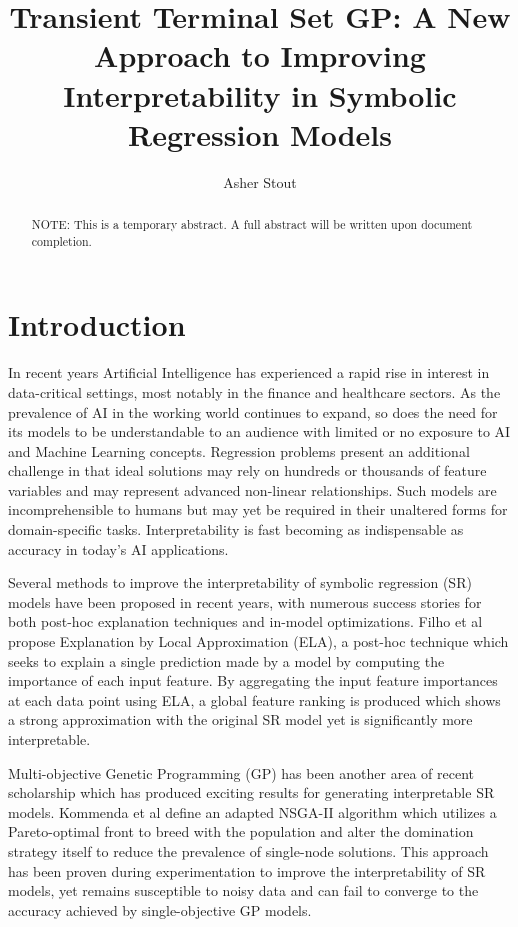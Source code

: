 \documentclass[a4paper, twocolumn]{article}
\title{Transient Terminal Set GP: A New Approach to Improving Interpretability in Symbolic Regression Models}
\author{Asher Stout}
\begin{document}
\maketitle
\begin{abstract}
NOTE: This is a temporary abstract. A full abstract will be written upon document completion.
\end{abstract}

\section{Introduction}
In recent years Artificial Intelligence has experienced a rapid rise in interest in data-critical settings, most notably in the finance and healthcare sectors. As the prevalence of AI in the working world continues to expand, so does the need for its models to be understandable to an audience with limited or no exposure to AI and Machine Learning concepts. Regression problems present an additional challenge in that ideal solutions may rely on hundreds or thousands of feature variables and may represent advanced non-linear relationships. Such models are incomprehensible to humans but may yet be required in their unaltered forms for domain-specific tasks. Interpretability is fast becoming as indispensable as accuracy in today's AI applications.

Several methods to improve the interpretability of symbolic regression (SR) models have been proposed in recent years, with numerous success stories for both post-hoc explanation techniques and in-model optimizations. Filho et al propose Explanation by Local Approximation (ELA), a post-hoc technique which seeks to explain a single prediction made by a model by computing the importance of each input feature\cite{1}. By aggregating the input feature importances at each data point using ELA, a global feature ranking is produced which shows a strong approximation with the original SR model yet is significantly more interpretable.

Multi-objective Genetic Programming (GP) has been another area of recent scholarship which has produced exciting results for generating interpretable SR models. Kommenda et al define an adapted NSGA-II algorithm which utilizes a Pareto-optimal front to breed with the population and alter the domination strategy itself to reduce the prevalence of single-node solutions\cite{2}. This approach has been proven during experimentation to improve the interpretability of SR models, yet remains susceptible to noisy data and can fail to converge to the accuracy achieved by single-objective GP models.
\end{document}
